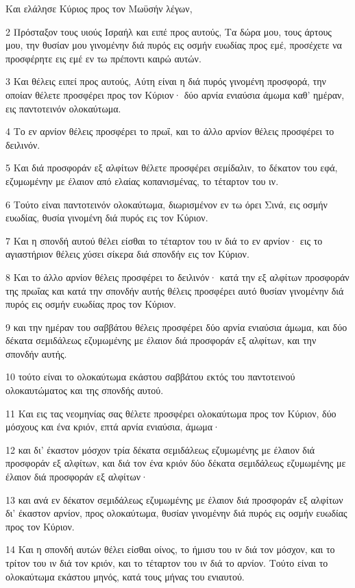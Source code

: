 \par Και ελάλησε Κύριος προς τον Μωϋσήν λέγων,
\par 2 Πρόσταξον τους υιούς Ισραήλ και ειπέ προς αυτούς, Τα δώρα μου, τους άρτους μου, την θυσίαν μου γινομένην διά πυρός εις οσμήν ευωδίας προς εμέ, προσέχετε να προσφέρητε εις εμέ εν τω πρέποντι καιρώ αυτών.
\par 3 Και θέλεις ειπεί προς αυτούς, Αύτη είναι η διά πυρός γινομένη προσφορά, την οποίαν θέλετε προσφέρει προς τον Κύριον· δύο αρνία ενιαύσια άμωμα καθ' ημέραν, εις παντοτεινόν ολοκαύτωμα.
\par 4 Το εν αρνίον θέλεις προσφέρει το πρωΐ, και το άλλο αρνίον θέλεις προσφέρει το δειλινόν.
\par 5 Και διά προσφοράν εξ αλφίτων θέλετε προσφέρει σεμίδαλιν, το δέκατον του εφά, εζυμωμένην με έλαιον από ελαίας κοπανισμένας, το τέταρτον του ιν.
\par 6 Τούτο είναι παντοτεινόν ολοκαύτωμα, διωρισμένον εν τω όρει Σινά, εις οσμήν ευωδίας, θυσία γινομένη διά πυρός εις τον Κύριον.
\par 7 Και η σπονδή αυτού θέλει είσθαι το τέταρτον του ιν διά το εν αρνίον· εις το αγιαστήριον θέλεις χύσει σίκερα διά σπονδήν εις τον Κύριον.
\par 8 Και το άλλο αρνίον θέλεις προσφέρει το δειλινόν· κατά την εξ αλφίτων προσφοράν της πρωΐας και κατά την σπονδήν αυτής θέλεις προσφέρει αυτό θυσίαν γινομένην διά πυρός εις οσμήν ευωδίας προς τον Κύριον.
\par 9 και την ημέραν του σαββάτου θέλεις προσφέρει δύο αρνία ενιαύσια άμωμα, και δύο δέκατα σεμιδάλεως εζυμωμένης με έλαιον διά προσφοράν εξ αλφίτων, και την σπονδήν αυτής.
\par 10 τούτο είναι το ολοκαύτωμα εκάστου σαββάτου εκτός του παντοτεινού ολοκαυτώματος και της σπονδής αυτού.
\par 11 Και εις τας νεομηνίας σας θέλετε προσφέρει ολοκαύτωμα προς τον Κύριον, δύο μόσχους και ένα κριόν, επτά αρνία ενιαύσια, άμωμα·
\par 12 και δι' έκαστον μόσχον τρία δέκατα σεμιδάλεως εζυμωμένης με έλαιον διά προσφοράν εξ αλφίτων, και διά τον ένα κριόν δύο δέκατα σεμιδάλεως εζυμωμένης με έλαιον διά προσφοράν εξ αλφίτων·
\par 13 και ανά εν δέκατον σεμιδάλεως εζυμωμένης με έλαιον διά προσφοράν εξ αλφίτων δι' έκαστον αρνίον, προς ολοκαύτωμα, θυσίαν γινομένην διά πυρός εις οσμήν ευωδίας προς τον Κύριον.
\par 14 Και η σπονδή αυτών θέλει είσθαι οίνος, το ήμισυ του ιν διά τον μόσχον, και το τρίτον του ιν διά τον κριόν, και το τέταρτον του ιν διά το αρνίον. Τούτο είναι το ολοκαύτωμα εκάστου μηνός, κατά τους μήνας του ενιαυτού.
